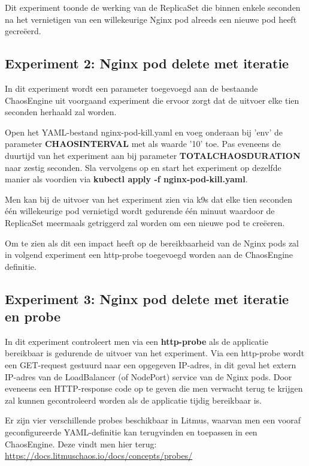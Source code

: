Dit experiment toonde de werking van de ReplicaSet die binnen enkele seconden na het vernietigen van een willekeurige Nginx pod alreeds een nieuwe pod heeft gecreëerd.

\subsection{Experiment 2: Nginx pod delete met iteratie}

In dit experiment wordt een parameter toegevoegd aan de bestaande ChaosEngine uit voorgaand experiment die ervoor zorgt dat de uitvoer elke tien seconden herhaald zal worden. 

Open het YAML-bestand nginx-pod-kill.yaml en voeg onderaan bij 'env' de parameter {\bf CHAOS\textunderscore INTERVAL} met als waarde '10' toe. Pas eveneens de duurtijd van het experiment aan bij parameter {\bf TOTAL\textunderscore CHAOS\textunderscore DURATION} naar zestig seconden. Sla vervolgens op en start het experiment op dezelfde manier als voordien via {\bf kubectl apply -f nginx-pod-kill.yaml}. 

Men kan bij de uitvoer van het experiment zien via k9s dat elke tien seconden één willekeurige pod vernietigd wordt gedurende één minuut waardoor de ReplicaSet meermaals getriggerd zal worden om een nieuwe pod te creëeren.

Om te zien als dit een impact heeft op de bereikbaarheid van de Nginx pods zal in volgend experiment een http-probe toegevoegd worden aan de ChaosEngine definitie. 

\subsection{Experiment 3: Nginx pod delete met iteratie en probe}

In dit experiment controleert men via een {\bf http-probe} als de applicatie bereikbaar is gedurende de uitvoer van het experiment. Via een http-probe wordt een GET-request gestuurd naar een opgegeven IP-adres, in dit geval het extern IP-adres van de LoadBalancer (of NodePort) service van de Nginx pods. Door eveneens een HTTP-response code op te geven die men verwacht terug te krijgen zal kunnen gecontroleerd worden als de applicatie tijdig bereikbaar is. 

Er zijn vier verschillende probes beschikbaar in Litmus, waarvan men een vooraf geconfigureerde YAML-definitie kan terugvinden en toepassen in een ChaosEngine. Deze vindt men hier terug: \url{https://docs.litmuschaos.io/docs/concepts/probes/} 

